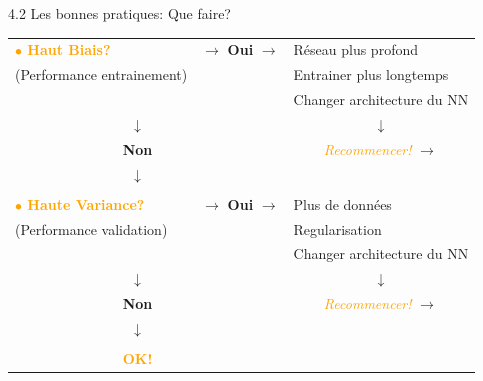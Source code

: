 \begin{frame}{4.2 Les bonnes pratiques: Que faire?}
  \begin{table}
    \begin{tabular}{ccccl}
      \multicolumn{3}{l}{\textcolor{orange}{\textbf{$\bullet$ Haut Biais?}}} & \boldmath $\rightarrow$ \textbf{Oui} $\rightarrow$ \unboldmath & Réseau plus profond \\
      \multicolumn{3}{l}{(Performance entrainement)} & & Entrainer plus longtemps \\
      & & & & Changer architecture du NN \\
      & & \boldmath $\downarrow$ \unboldmath & & \multicolumn{1}{c}{\boldmath $\downarrow$ \boldmath} \\
      & & \textbf{Non} & & \multicolumn{1}{c}{\textit{\textcolor{orange}{Recommencer!}} \boldmath $\rightarrow$ \unboldmath}\\
      & & \boldmath $\downarrow$ \unboldmath & & \\
      & & & & \\
      \multicolumn{3}{l}{\textcolor{orange}{\textbf{$\bullet$ Haute Variance?}}} & \boldmath $\rightarrow$ \textbf{Oui} $\rightarrow$ \unboldmath & Plus de données \\
      \multicolumn{3}{l}{(Performance validation)} & & Regularisation \\
      & & & & Changer architecture du NN \\
      & & \boldmath $\downarrow$ \unboldmath & & \multicolumn{1}{c}{\boldmath $\downarrow$ \boldmath} \\
      & & \textbf{Non} & & \multicolumn{1}{c}{\textit{\textcolor{orange}{Recommencer!}} \boldmath $\rightarrow$ \unboldmath}\\
      & & \boldmath $\downarrow$ \unboldmath & & \\
      & & & & \\
      & & \textcolor{orange}{\textbf{OK!}} & & \\      
    \end{tabular}
  \end{table}
\end{frame}

